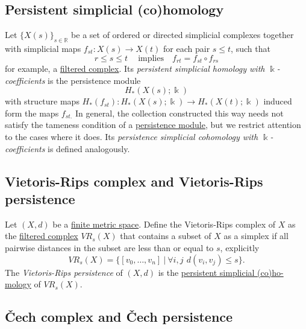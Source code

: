 \documentclass{amsart}
\begin{document}
	\subsection*{Persistent simplicial (co)homology} \label{persistent simplicial (co)homology}
	
	Let $\{X(s)\}_{s \in \mathbb R} $ be a set of ordered or directed simplicial complexes together with simplicial maps $f_{st} : X(s) \to X(t)$ for each pair $s \leq t$, such that 
	\begin{equation*}
	r \leq s \leq t\ \quad\text{implies} \quad f_{rt} = f_{st} \circ f_{rs}
	\end{equation*}
	for example, a \hyperref[filtered complex]{filtered complex}. Its \textit{persistent simplicial homology with $\Bbbk$-coefficients} is the persistence module
	\begin{equation*}
	H_*(X(s); \Bbbk)
	\end{equation*}
	with structure maps $H_*(f_{st}) : H_*(X(s); \Bbbk) \to H_*(X(t); \Bbbk)$ induced form the maps $f_{st.}$ In general, the collection constructed this way needs not satisfy the tameness condition of a \hyperref[persistence module]{persistence module}, but we restrict attention to the cases where it does. Its \textit{persistence simplicial cohomology with $\Bbbk$-coefficients} is defined analogously.
	
	\subsection*{Vietoris-Rips complex and Vietoris-Rips persistence} \label{vietoris-rips complex and vietoris-rips persistence}
	
	Let $(X, d)$ be a \hyperref[finite metric spaces and point clouds]{finite metric space}. Define the Vietoris-Rips complex of $X$ as the \hyperref[filtered complex]{filtered complex} $VR_s(X)$ that contains a subset of $X$ as a simplex if all pairwise distances in the subset are less than or equal to $s$, explicitly
	\begin{equation*}
	VR_s(X) = \Big\{ [v_0,\dots,v_n]\ \Big|\ \forall i,j\ \,d(v_i, v_j) \leq s \Big\}.
	\end{equation*}
	The \textit{Vietoris-Rips persistence} of $(X, d)$ is the \hyperref[persistent simplicial (co)homology]{persistent simplicial (co)ho-mology} of $VR_s(X)$.
	
	\subsection*{\v{C}ech complex and \v{C}ech persistence} \label{cech complex and cech persistence}
	
\end{document}
